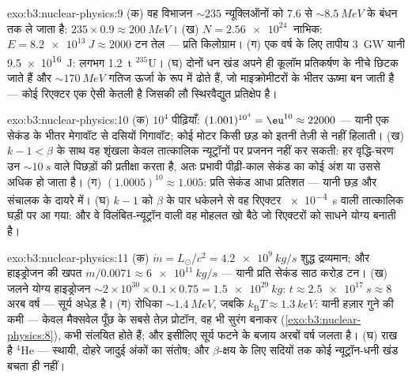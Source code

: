 \begin{solution}{exo:b3:nuclear-physics:9}
(क) वह विभाजन ${\sim}235$ न्यूक्लिऑनों को \qty{7.6}{} से
${\sim}\qty{8.5}{MeV}$ के बंधन तक ले जाता है: $235\times0.9 \approx
\qty{200}{MeV}$। (ख) $N = \qty{2.56e24}{}$ नाभिक:
$E = \qty{8.2e13}{J} \approx 2000$ टन तेल --- प्रति
किलोग्राम। (ग) एक वर्ष के लिए तापीय \qty{3}{GW} यानी
\qty{9.5e16}{J}: लगभग \qty{1.2}{t} $^{235}$U। (घ) दोनों
धन खंड अपने ही कूलॉम प्रतिकर्षण के नीचे छिटक जाते हैं और
${\sim}\qty{170}{MeV}$ गतिज ऊर्जा के रूप में ढोते हैं,
जो माइक्रोमीटरों के भीतर ऊष्मा बन जाती है --- कोई रिएक्टर एक ऐसी
केतली है जिसकी लौ स्थिरवैद्युत प्रतिक्षेप है।
\end{solution}

\begin{solution}{exo:b3:nuclear-physics:10}
(क) $10^4$ पीढ़ियाँ: $(1.001)^{10^4} = \eu^{10} \approx
22000$ --- यानी एक सेकंड के भीतर मेगावॉट से दसियों गिगावॉट; कोई
मोटर किसी छड़ को इतनी तेज़ी से नहीं हिलाती। (ख) $k - 1 < \beta$ के
साथ वह शृंखला केवल तात्कालिक न्यूट्रॉनों पर प्रजनन नहीं कर सकती: हर
वृद्धि-चरण उन ${\sim}\qty{10}{s}$ वाले पिछड़ों की प्रतीक्षा करता है,
अतः प्रभावी पीढ़ी-काल सेकंड का कोई अंश या उससे अधिक हो जाता है। (ग)
$(1.0005)^{10} \approx 1.005$: प्रति सेकंड आधा प्रतिशत ---
यानी छड़ और संचालक के दायरे में। (घ) $k - 1$ को $\beta$ के पार
धकेलने से वह रिएक्टर \qty{e-4}{s} वाली तात्कालिक घड़ी पर आ गया: और
वे विलंबित-न्यूट्रॉन वाली वह मोहलत खो बैठे जो रिएक्टरों को साधने
योग्य बनाती है।
\end{solution}

\begin{solution}{exo:b3:nuclear-physics:11}
(क) $\dot m = L_\odot/c^2 = \qty{4.2e9}{kg/s}$ शुद्ध द्रव्यमान;
और हाइड्रोजन की खपत $\dot m/0.0071 \approx \qty{6e11}{kg/s}$ ---
यानी प्रति सेकंड साठ करोड़ टन। (ख) जलने योग्य हाइड्रोजन
${\sim}2\times10^{30}\times0.1\times0.75 = \qty{1.5e29}{kg}$:
$t \approx \qty{2.5e17}{s} \approx 8$ अरब वर्ष --- सूर्य
अधेड़ है। (ग) रोधिका ${\sim}\qty{1.4}{MeV}$, जबकि
$k_{\text{B}}T \approx \qty{1.3}{keV}$: यानी हज़ार गुने की कमी
--- केवल मैक्सवेल पूँछ के सबसे तेज़ प्रोटॉन, वह भी सुरंग बनाकर
(\cref{exo:b3:nuclear-physics:8}), कभी संलयित होते हैं; और इसीलिए
सूर्य फटने के बजाय अरबों वर्ष जलता है। (घ) राख है
$^4$He --- स्थायी, दोहरे जादुई अंकों का संतोष; और $\beta$-क्षय के
लिए सदियों तक कोई न्यूट्रॉन-धनी खंड बचता ही नहीं।
\end{solution}

